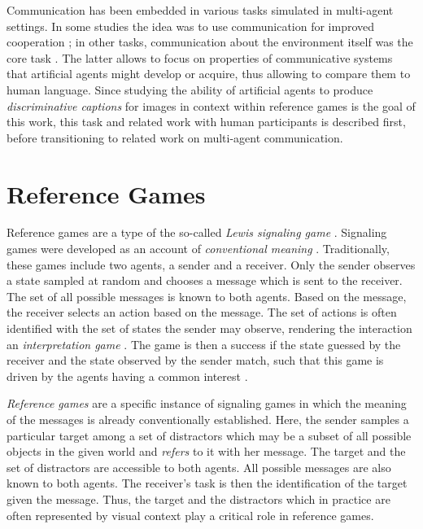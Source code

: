 Communication has been embedded in various tasks simulated in multi-agent settings. In some studies the idea was to use communication for improved cooperation \parencite[e.~g.,][]{foerster2016learning, mordatch2018emergence}; in other tasks, communication about the environment itself was the core task \parencite[e.~g.,][]{lazaridou2018emergence}. The latter allows to focus on properties of communicative systems that artificial agents might develop or acquire, thus allowing to compare them to human language. Since studying the ability of artificial agents to produce \textit{discriminative captions} for images in context within reference games is the goal of this work, this task and related work with human participants is described first, before transitioning to related work on multi-agent communication.

\section{Reference Games}
\label{reference_games}

Reference games are a type of the so-called \textit{Lewis signaling game} \parencite{lewis1969convention, skyrms2010signals}.
Signaling games were developed as an account of \textit{conventional meaning} \parencite{grice1975logic}. Traditionally, these games include two agents, a sender and a receiver. Only the sender observes a state sampled at random and chooses a message which is sent to the receiver. The set of all possible messages is known to both agents. Based on the message, the receiver selects an action based on the message. The set of actions is often identified with the set of states the sender may observe, rendering the interaction an \emph{interpretation game} \parencite{franke2016reasoning}. The game is then a success if the state guessed by the receiver and the state observed by the sender match, such that this game is driven by the agents having a common interest \parencite{lewis1969convention} \parencite[although see][for a relaxation of this assumption]{jager2014rationalizable}. 

\textit{Reference games} are a specific instance of signaling games in which the meaning of the messages is already conventionally established. Here, the sender samples a particular target among a set of distractors which may be a subset of all possible objects in the given world and \textit{refers} to it with her message. The target and the set of distractors are accessible to both agents. All possible messages are also known to both agents. The receiver's task is then the identification of the target given the message. Thus, the target and the distractors which in practice are often represented by visual context play a critical role in reference games.

